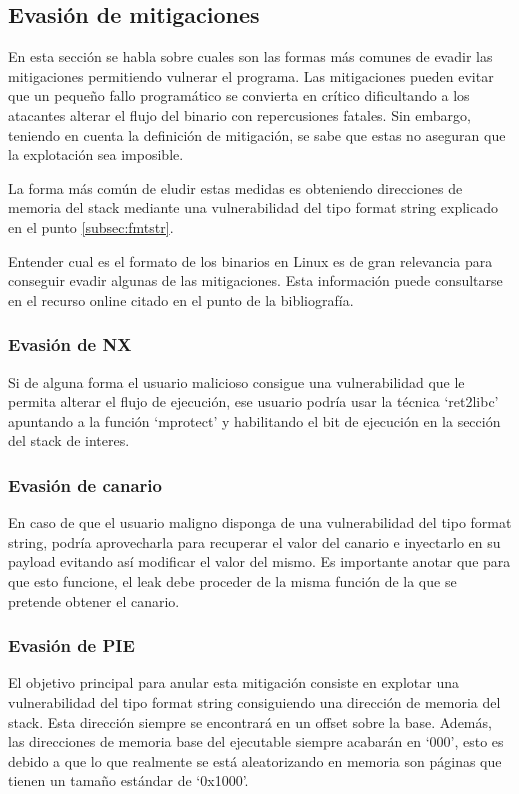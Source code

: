 \subsection{Evasión de mitigaciones}
En esta sección se habla sobre cuales son las formas más comunes de evadir las mitigaciones permitiendo vulnerar el programa.
Las mitigaciones pueden evitar que un pequeño fallo programático se convierta en crítico dificultando a los atacantes alterar el flujo del binario con repercusiones fatales.
Sin embargo, teniendo en cuenta la definición de mitigación, se sabe que estas no aseguran que la explotación sea imposible.

La forma más común de eludir estas medidas es obteniendo direcciones de memoria del stack mediante una vulnerabilidad del tipo format string explicado en el punto \ref{subsec:fmtstr}.

Entender cual es el formato de los binarios en Linux es de gran relevancia para conseguir evadir algunas de las mitigaciones.
Esta información puede consultarse en el recurso online citado en el punto \cite{x64asm} de la bibliografía.

\subsubsection{Evasión de NX}
Si de alguna forma el usuario malicioso consigue una vulnerabilidad que le permita alterar el flujo de ejecución, ese usuario podría usar la técnica `ret2libc' apuntando a la función `mprotect' y habilitando el bit de ejecución en la sección del stack de interes.

\subsubsection{Evasión de canario}
En caso de que el usuario maligno disponga de una vulnerabilidad del tipo format string, podría aprovecharla para recuperar el valor del canario e inyectarlo en su payload evitando así modificar el valor del mismo.
Es importante anotar que para que esto funcione, el leak debe proceder de la misma función de la que se pretende obtener el canario.
\subsubsection{Evasión de PIE} \label{subsub:pie}
El objetivo principal para anular esta mitigación consiste en explotar una vulnerabilidad del tipo format string consiguiendo una dirección de memoria del stack.
Esta dirección siempre se encontrará en un offset sobre la base.
Además, las direcciones de memoria base del ejecutable siempre acabarán en `000', esto es debido a que lo que realmente se está aleatorizando en memoria son páginas que tienen un tamaño estándar de `0x1000'.

